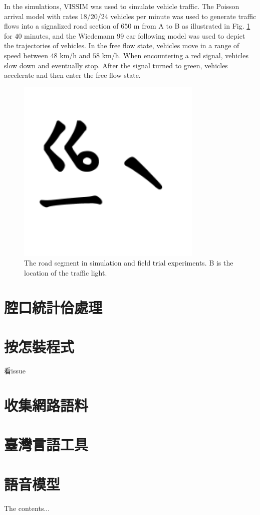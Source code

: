 \documentclass[final,oneside,onecolumn,12pt,a4paper]{book}%
\begin{document}
In the simulations, VISSIM \cite{Mosseri2004VISSIM} was used to simulate
vehicle traffic. The Poisson arrival model with rates 18/20/24 vehicles per
minute was used to generate traffic flows into a signalized road section of
$650$ m from A to B as illustrated in Fig. \ref{fig:f_map} for $40$ minutes,
and the Wiedemann 99 car following model \cite{Mosseri2004VISSIM} was used to
depict the trajectories of vehicles. In the free flow state, vehicles move in
a range of speed between $48$ km/h and $58$ km/h. When encountering a red
signal, vehicles slow down and eventually stop. After the signal turned to
green, vehicles accelerate and then enter the free flow state.
\begin{figure}[pth]
\centerline{\includegraphics[angle=0, width=3.5in,keepaspectratio]
{音/⿳⿳ㆣㄧˋ}} \hfill\caption{The road segment in simulation and field
trial experiments. B is the location of the traffic light.}%
\label{fig:f_map}%
\end{figure}




\begin{appendices}
\chapter{腔口統計佮處理}
\label{章：腔口統計佮處理}
\chapter{按怎裝程式}
\label{章：按怎裝程式}
看issue
\chapter{收集網路語料}
\label{章：收集網路語料}
\chapter{臺灣言語工具}
\label{章：臺灣言語工具}
\chapter{語音模型}
\label{章：語音模型}
The contents...
\end{appendices}
\end{document}
